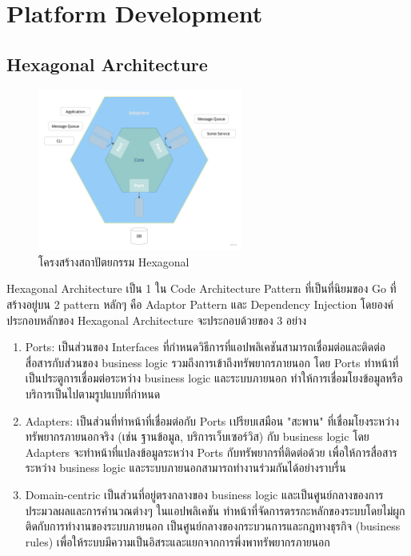 \section{Platform Development}
  \subsection{Hexagonal Architecture}
    \begin{figure}[!h]
      \centering
      \includegraphics[width=0.6\textwidth]{image/Background/hex.png}
      \caption[Hexagonal Architecture]{โครงสร้างสถาปัตยกรรม Hexagonal}
      \label{fig:hex_pic}
    \end{figure}
    \FloatBarrier
    \qquad Hexagonal Architecture เป็น 1 ใน Code Architecture Pattern ที่เป็นที่นิยมของ Go ที่สร้างอยู่บน 2 pattern หลักๆ คือ Adaptor Pattern และ Dependency Injection  โดยองค์ประกอบหลักของ Hexagonal Architecture จะประกอบด้วยของ 3 อย่าง \cite{Hexagonal1}\cite{Hexagonal2}
    \begin{enumerate}
      \item Ports: เป็นส่วนของ Interfaces ที่กำหนดวิธีการที่แอปพลิเคชันสามารถเชื่อมต่อและติดต่อสื่อสารกับส่วนของ business logic รวมถึงการเข้าถึงทรัพยากรภายนอก โดย Ports ทำหน้าที่เป็นประตูการเชื่อมต่อระหว่าง business logic และระบบภายนอก ทำให้การเชื่อมโยงข้อมูลหรือบริการเป็นไปตามรูปแบบที่กำหนด\
      \item Adapters: เป็นส่วนที่ทำหน้าที่เชื่อมต่อกับ Ports เปรียบเสมือน "สะพาน" ที่เชื่อมโยงระหว่างทรัพยากรภายนอกจริง (เช่น ฐานข้อมูล, บริการเว็บเซอร์วิส) กับ business logic โดย Adapters จะทำหน้าที่แปลงข้อมูลระหว่าง Ports กับทรัพยากรที่ติดต่อด้วย เพื่อให้การสื่อสารระหว่าง business logic และระบบภายนอกสามารถทำงานร่วมกันได้อย่างราบรื่น
      \item Domain-centric เป็นส่วนที่อยู่ตรงกลางของ business logic และเป็นศูนย์กลางของการประมวลผลและการคำนวณต่างๆ ในแอปพลิเคชัน ทำหน้าที่จัดการตรรกะหลักของระบบโดยไม่ผูกติดกับการทำงานของระบบภายนอก เป็นศูนย์กลางของกระบวนการและกฎทางธุรกิจ (business rules) เพื่อให้ระบบมีความเป็นอิสระและแยกจากการพึ่งพาทรัพยากรภายนอก
    \end{enumerate}

